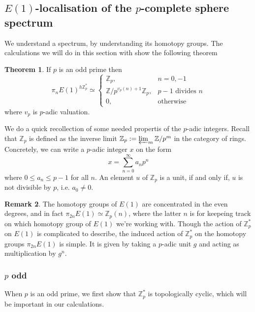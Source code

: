 \documentclass[a4paper]{article} %
\theoremstyle{definition}
\newtheorem{theorem}{Theorem} %
\newtheorem{remark}[theorem]{Remark}
\newcommand{\Z}{\mathbb{Z}}
\begin{document}
\subsection{$E(1)$-localisation of the $p$-complete sphere spectrum}

We understand a spectrum, by understanding its homotopy groups. The calculations we will do in this section with show the following theorem
\begin{theorem}
 If $p$ is an odd prime  then
 \[
  \pi_n E(1)^{h\Z_p^*} \simeq
    \begin{cases}
    \Z_p, & n=0,-1 \\
    \Z/p^{v_p(n)+1}\Z_p, & p-1 \text{ divides } n \\
    0, & \text{otherwise}
    \end{cases}
  \]
  where $v_p$ is $p$-adic valuation.
\end{theorem}

We do a quick recollection of some needed propertis of the $p$-adic integers. Recall that $\Z_p$ is defined as the inverse limit $\Z_p := \varprojlim_m \Z/p^m$ in the category of rings. Concretely, we can write a $p$-adic integer $x$ on the form
\[
  x=\sum_{n = 0}^\infty a_n p^n
\]
where $ 0 \le a_n \le p-1$ for all $n$.
An element $u$ of $\Z_p$ is a unit, if and only if, $u$ is not divisible by $p$, i.e. $a_0 \neq 0$.

\begin{remark}
  The homotopy groups of $E(1)$ are concentrated in the even degrees, and in fact $\pi_{2n}E(1) \simeq \Z_p(n)$, where the latter $n$ is for keepeing track on which homotopy group of $E(1)$ we're working with. Though the action of $\Z_p^*$ on $E(1)$ is complicated to describe, the induced action of $\Z_p^*$ on the homotopy groups $\pi_{2n}E(1)$ is simple. It is given by taking a $p$-adic unit $g$ and acting as multiplication by $g^n$.
\end{remark}

\subsubsection{$p$ odd}

When $p$ is an odd prime, we first show that $\Z_p^*$ is topologically cyclic, which will be important in our calculations.
\end{document}
